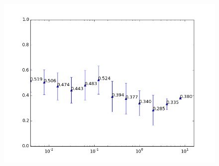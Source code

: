 \begin{figure}[h!]
\begin{minipage}{.49\linewidth}
		\label{fig:regularization_normalepsilon}
	\end{minipage}
	\begin{minipage}{.49\linewidth}
		\includegraphics[width=\linewidth]{fig/spambase/eps0.01,budg=eps,peers10,groups10,reg2e-8-2e3-data368-pubAll-spam-baseline-testsetmean}
		\label{fig:regularization_lowepsilon}
	\end{minipage}
\end{figure}


